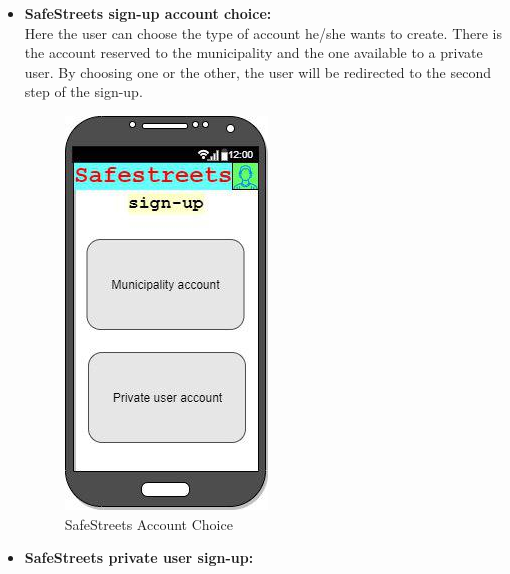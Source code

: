 \documentclass[titlepage]{article}
\begin{document}
\begin{itemize}
\begin{itemize}
	
	\newpage
	
	\item \textbf{SafeStreets sign-up account choice:}\\
	
	Here the user can choose the type of account he/she wants to create. There is the account reserved to the municipality and the one available to a private user. By choosing one or the other, the user will be redirected to the second step of the sign-up.
	
	\begin{figure}[h]
	\includegraphics[scale=0.7]{Mockups/Account choice.png}
	\centering
	\caption{SafeStreets Account Choice}
	\end{figure}
	\FloatBarrier
	
	
	\newpage
	
	\item \textbf{SafeStreets private user sign-up:}\\
	

\end{itemize}
\end{itemize}
\end{document}
